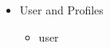 \documentclass[a4paper, 14pt]{extarticle}
\begin{document}
\begin{itemize}
    \item User and Profiles
        \begin{itemize}
            \item user

\end{itemize}
\end{itemize}
\end{document}
